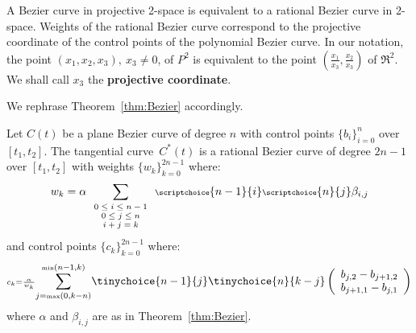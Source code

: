 \documentclass[9pt,twocolumn]{article}
\newcommand{\tang}{tangential curve\ }
\begin{document}
A Bezier curve in projective 2-space is equivalent to a 
rational Bezier curve in 2-space.
Weights of the rational Bezier curve correspond to the
projective coordinate of the control points of the polynomial Bezier curve.
In our notation, the point $(x_1,x_2,x_3),\ x_3 \neq 0$, of $P^2$ is equivalent 
to the point $(\frac{x_1}{x_3}, \frac{x_2}{x_3})$ of $\Re^2$.
We shall call $x_3$ the {\bf projective coordinate}.

We rephrase Theorem~\ref{thm:Bezier} accordingly.

\begin{corollary}
\label{thm:rationaldual}
Let $C(t)$ be a plane Bezier curve of degree $n$ 
with control points $\{ b_i \}_{i=0}^n$ over $[t_1,t_2]$.
The \tang $C^*(t)$ is a rational Bezier curve of degree $2n-1$ 
over $[t_1,t_2]$ with weights $\{w_k\}_{k=0}^{2n-1}$ where: 
\begin{equation}
\label{eq:wt}
\scriptsize{
w_k = \alpha
\sum_{\begin{array}{c}       0 \leq i \leq n-1 \\ 
			     0 \leq j \leq n \\ 
			     i+j=k
			     \end{array}}
\scriptchoice{n-1}{i} \scriptchoice{n}{j} \beta_{i,j}
}
\end{equation}
%
and control points $\{c_k\}_{k=0}^{2n-1}$ where:
\[
\scriptstyle{
	c_k = \frac{\alpha}{w_k} 
	\displaystyle{\sum_{j=\mbox{\tiny{max}}(0,k-n)}^{\mbox{\tiny{min}}(n-1,k)}}
	\tinychoice{n-1}{j} \tinychoice{n}{k-j} 
	\left( \begin{array}{c} 
	b_{j,2}   - b_{j+1,2} \\
	b_{j+1,1} - b_{j,1}
	\end{array} \right) 
}
\]
where $\alpha$ and $\beta_{i,j}$ are as in Theorem~\ref{thm:Bezier}.
\end{corollary}
\end{document}
